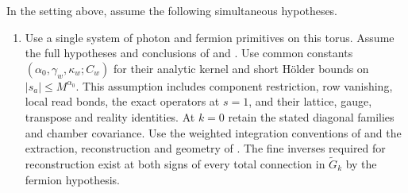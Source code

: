 \begin{theorem}\label{thm:rgnl-current-step}
In the setting above, assume the following simultaneous hypotheses.
\begin{enumerate}[label=\textup{(\roman*)},leftmargin=*]
\item Use a single system of photon and fermion primitives on this
torus. Assume the full hypotheses and conclusions of
\cite[Theorems~A--B and Proposition~5.1]{MaxwellBlockManuscript}
and
\cite[Theorem~A, Propositions~4.1,
4.2,
4.3,
6.1 and
6.2]{FermionBlockManuscript}.
Use common constants $(\alpha_0,\gamma_w,\kappa_w;C_w)$ for their
analytic kernel and short H\"older bounds on
$|s_a|\le M^{\alpha_0}$. This assumption includes component
restriction, row vanishing, local read bonds, the exact operators at
$s=1$, and their lattice, gauge, transpose and reality identities.
At $k=0$ retain the stated diagonal families and chamber covariance.
Use the weighted integration conventions of
\cite[Theorem~B and Proposition~5.1]{FermionBlockManuscript}
and the extraction, reconstruction and geometry of
\cite[Theorems~A--B and Appendix~B]{NormalizedContraction}.
The fine inverses required for reconstruction exist at both signs
of every total connection in $\widetilde G_k$ by the fermion hypothesis.


\end{enumerate}
\end{theorem}
